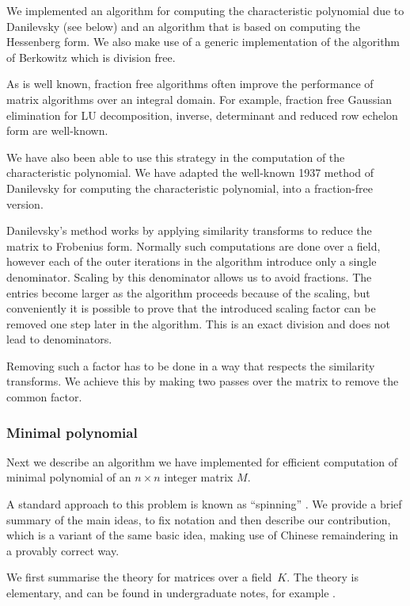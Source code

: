 \documentclass{sig-alternate-05-2015}
\begin{document}
We implemented an algorithm for computing the characteristic polynomial due to
Danilevsky (see below) and an algorithm that is based on computing the Hessenberg
form. We also make use of a generic implementation of the algorithm of Berkowitz which
is division free. 

As is well known, fraction free algorithms often improve the performance of matrix
algorithms over an integral domain. For example, fraction free Gaussian elimination
for LU decomposition, inverse, determinant and reduced row echelon form
are well-known.

We have also been able to use this strategy in the computation
of the characteristic polynomial. We have adapted the well-known 1937 method
of Danilevsky \cite{danilevsky} for computing the characteristic polynomial, into
a fraction-free version.

Danilevsky's method works by applying similarity transforms to reduce the
matrix to Frobenius form. Normally such computations are done over a
field, however each of the outer iterations in the algorithm introduce only
a single denominator. Scaling by this denominator allows us to avoid
fractions.
The entries become larger
as the algorithm proceeds because of the scaling, but conveniently
it is possible to prove that the introduced scaling factor can be removed 
one step later in the algorithm. This is an exact division and does not
lead to denominators.

Removing such a factor has to be done in a way that respects the
similarity transforms. We achieve this by making two passes over the matrix
to remove the common factor.

\subsubsection{Minimal polynomial}

Next we describe an algorithm we have implemented for efficient
computation of minimal polynomial of an $n\times n$ integer matrix $M$.

A standard approach to this problem is known as ``spinning'' \cite{steel}.
We provide a brief summary of the main ideas, to fix notation and then
describe our contribution, which is a variant of the same basic idea, making
use of Chinese remaindering in a provably correct way.

We first summarise the theory for matrices over a field~$K$. The theory
is elementary, and can be found in undergraduate notes, for example \cite{conrad}.
\end{document}
